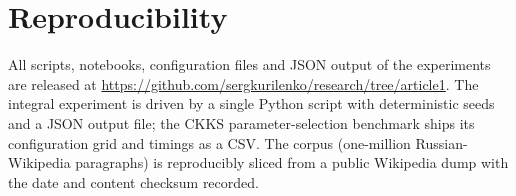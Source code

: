 \documentclass[11pt,a4paper]{article}
\begin{document}
\section*{Reproducibility}

All scripts, notebooks, configuration files and JSON output of the
experiments are released at
\url{https://github.com/sergkurilenko/research/tree/article1}.
The integral experiment is driven by a single Python script with
deterministic seeds and a JSON output file; the CKKS parameter-selection
benchmark ships its configuration grid and timings as a CSV. The corpus
(one-million Russian-Wikipedia paragraphs) is reproducibly sliced from a
public Wikipedia dump with the date and content checksum recorded.
\end{document}
